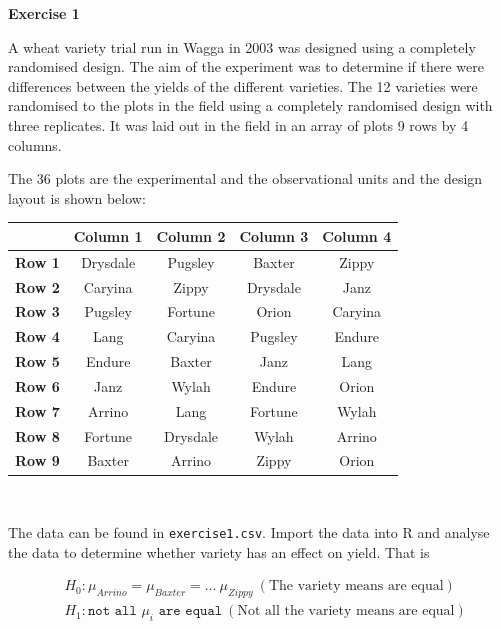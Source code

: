 \documentclass[a4paper, 10pt, fleqn, twosided]{memoir}
\begin{document}
\clearpage

\textbf{Exercise 1}

A  wheat variety trial run in Wagga in 2003 was designed using a completely randomised design. The aim of the
experiment was to determine if there were differences between the yields of the different varieties. The 12 varieties
were randomised to the plots in the field using a completely randomised design with three replicates. It was laid out
in the field in an array of plots 9 rows by 4 columns.

The 36 plots are the experimental and the observational units and the design layout is shown below:
\begin{center}
\small
\begin{tabular}{|l|c|c|c|c|}
  \hline
    & \textbf{Column 1} & \textbf{Column 2} & \textbf{Column 3} & \textbf{Column 4} \\
  \hline
  \textbf{Row 1} & Drysdale &  Pugsley & Baxter &  Zippy \\
  \hline
  \textbf{Row 2} & Caryina &  Zippy & Drysdale &  Janz \\
  \hline
  \textbf{Row 3} & Pugsley & Fortune &  Orion &  Caryina \\
  \hline
  \textbf{Row 4} & Lang &  Caryina &  Pugsley & Endure \\
  \hline
  \textbf{Row 5} & Endure &  Baxter &  Janz &  Lang \\
  \hline
  \textbf{Row 6} & Janz &  Wylah & Endure &  Orion \\
  \hline
  \textbf{Row 7} & Arrino &  Lang &  Fortune &  Wylah \\
  \hline
  \textbf{Row 8} & Fortune &  Drysdale &  Wylah & Arrino \\
  \hline
  \textbf{Row 9} & Baxter &  Arrino &  Zippy & Orion \\
  \hline
\end{tabular}\\
\end{center}

The data can be found in \texttt{exercise1.csv}. Import the data into R and analyse the data to determine whether
variety has an effect on yield. That is

\begin{align*}
& H_0: \mu_{Arrino} = \mu_{Baxter} = \hdots \ \mu_{Zippy} \: (\text{The variety means are equal})\\
& H_1: \texttt{not all } \mu_i \texttt{ are equal} \: (\text{Not all the variety means are equal})\\
\end{align*}
\end{document}
